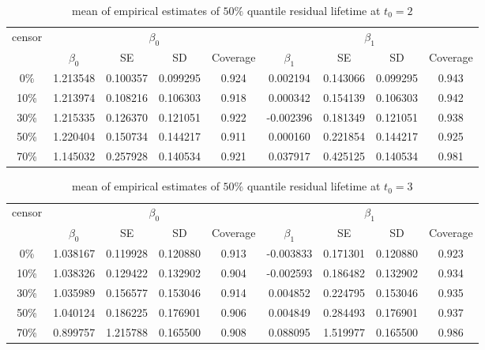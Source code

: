 \documentclass[12pt]{article}
\begin{document}
	\begin{table}[hbt!]
		\caption{mean of empirical estimates of $50\%$ quantile residual lifetime at $t_0=2$}
		\centering
		\begin{tabular}{|c|c|c|c|c|c|c|c|c|}
			\hline
			\multirow{2}{*}{censor} & \multicolumn{4}{c|}{$\beta_0$} & \multicolumn{4}{c|}{$\beta_1$}\\ \cline{2-9}
			& $\beta_0$ & SE & SD  & Coverage  & $\beta_1$ & SE & SD & Coverage\\
			\hline\hline
			0\% & 1.213548 & 0.100357 & 0.099295 & 0.924 & 0.002194 & 0.143066 & 0.099295 & 0.943 \\
			10\% & 1.213974 & 0.108216 & 0.106303 & 0.918 & 0.000342 & 0.154139 & 0.106303 & 0.942 \\
			30\% & 1.215335 & 0.126370 & 0.121051 & 0.922 & -0.002396 & 0.181349 & 0.121051 & 0.938 \\
			50\% & 1.220404 & 0.150734 & 0.144217 & 0.911 & 0.000160 & 0.221854 & 0.144217 & 0.925 \\
			70\% & 1.145032 & 0.257928 & 0.140534 & 0.921 & 0.037917 & 0.425125 & 0.140534 & 0.981 \\ 
			\hline
		\end{tabular}
	\end{table}
	\begin{table}[hbt!]
		\caption{mean of empirical estimates of $50\%$ quantile residual lifetime at $t_0=3$}
		\centering
		\begin{tabular}{|c|c|c|c|c|c|c|c|c|}
			\hline
			\multirow{2}{*}{censor} & \multicolumn{4}{c|}{$\beta_0$} & \multicolumn{4}{c|}{$\beta_1$}\\ \cline{2-9}
			& $\beta_0$ & SE & SD  & Coverage  & $\beta_1$ & SE & SD & Coverage\\
			\hline\hline
			0\% & 1.038167 & 0.119928 & 0.120880 & 0.913 & -0.003833 & 0.171301 & 0.120880 & 0.923 \\
			10\% & 1.038326 & 0.129422 & 0.132902 & 0.904 & -0.002593 & 0.186482 & 0.132902 & 0.934 \\
			30\% & 1.035989 & 0.156577 & 0.153046 & 0.914 & 0.004852 & 0.224795 & 0.153046 & 0.935 \\
			50\% & 1.040124 & 0.186225 & 0.176901 & 0.906 & 0.004849 & 0.284493 & 0.176901 & 0.937 \\
			70\% & 0.899757 & 1.215788 & 0.165500 & 0.908 & 0.088095 & 1.519977 & 0.165500 & 0.986 \\ 
			\hline
		\end{tabular}
	\end{table}
\end{document}
